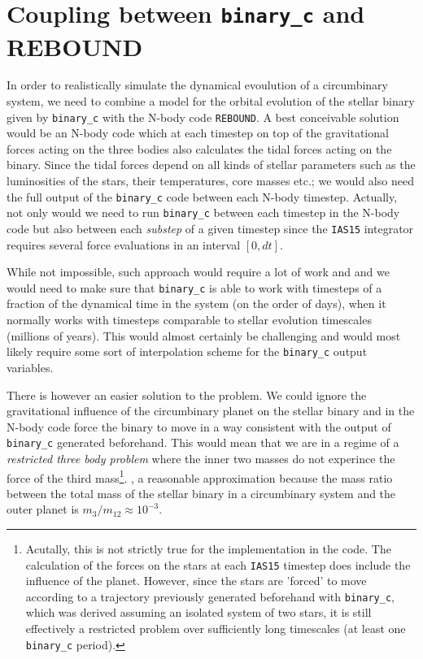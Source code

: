 \documentclass[ twoside,openright,titlepage,numbers=noenddot,headinclude,%
                footinclude=true,cleardoublepage=empty,abstractoff, %
                BCOR=5mm,paper=a4,fontsize=11pt,%
                american,%
                ]{scrreprt}
\begin{document}
\section{Coupling between \texttt{binary\_c} and REBOUND}
\label{sec:coupling_binary_c_rebound}
In order to realistically simulate the dynamical evoulution of a circumbinary
system, we need to combine a model for the orbital evolution of the stellar
binary given by \texttt{binary\_c} with the N-body code \texttt{REBOUND}. A best
conceivable solution would be an N-body code which at each timestep on top of
the gravitational forces acting on the three bodies also calculates the 
tidal forces acting on the binary. Since 
the tidal forces depend on all kinds of stellar parameters such as the
luminosities of the stars, their temperatures, core masses etc.; 
we would also need the full output of the \texttt{binary\_c} code between each 
N-body timestep. Actually, not only would we need to run \texttt{binary\_c} 
between each timestep in the N-body code but also between each \emph{substep}  
of a given timestep since the \texttt{IAS15} integrator requires several force
evaluations in an interval $[0,dt]$.

While not impossible, such approach would require a lot of work and and we
would need to make sure that \texttt{binary\_c} is able to work with timesteps
of a fraction of the dynamical time in the system (on the order of days), when
it normally works with timesteps comparable to stellar evolution timescales 
(millions of years). This would almost certainly be challenging and would most
likely
require some sort of interpolation scheme for the \texttt{binary\_c} output
variables.

There is  however an easier solution to the problem. We could ignore the gravitational
influence of the circumbinary planet on the stellar binary and in the N-body
code force the binary to move in a way consistent with the output of 
\texttt{binary\_c} generated beforehand. This would mean that we are in a regime
of a \emph{restricted three body problem} where the inner two masses do not 
experince the force of the third mass\footnote{Acutally, this is not strictly
true for the implementation in the code. The calculation of the forces on the 
stars at each \texttt{IAS15} timestep does include the influence of the planet.
However, since the stars are 'forced' to move according to a trajectory 
previously generated
beforehand with \texttt{binary\_c}, which was derived assuming an isolated system of 
two stars, it is still effectively a restricted problem over sufficiently long
timescales (at least one \texttt{binary\_c} period).}.
, a reasonable approximation because
the mass ratio between the total mass of the stellar binary in a circumbinary
system and the outer planet is $m_3/m_{12}\approx 10^{-3}$.
\end{document}
